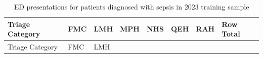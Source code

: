 \documentclass[
  a4paper,
  ,captions=tableheading
]{scrartcl}
\begin{document}
\begin{longtable}[]{@{}
  >{\raggedright\arraybackslash}p{}
  >{\raggedleft\arraybackslash}p{}
  >{\raggedleft\arraybackslash}p{}
  >{\raggedleft\arraybackslash}p{}
  >{\raggedleft\arraybackslash}p{}
  >{\raggedleft\arraybackslash}p{}
  >{\raggedleft\arraybackslash}p{}
  >{\raggedleft\arraybackslash}p{}@{}}
\caption{\label{tbl:hospitals_2023}ED presentations for patients
diagnosed with sepsis in 2023 training sample}\tabularnewline
\toprule\noalign{}
\begin{minipage}[b]{\linewidth}\raggedright
Triage Category
\end{minipage} & \begin{minipage}[b]{\linewidth}\raggedleft
FMC
\end{minipage} & \begin{minipage}[b]{\linewidth}\raggedleft
LMH
\end{minipage} & \begin{minipage}[b]{\linewidth}\raggedleft
MPH
\end{minipage} & \begin{minipage}[b]{\linewidth}\raggedleft
NHS
\end{minipage} & \begin{minipage}[b]{\linewidth}\raggedleft
QEH
\end{minipage} & \begin{minipage}[b]{\linewidth}\raggedleft
RAH
\end{minipage} & \begin{minipage}[b]{\linewidth}\raggedleft
Row Total
\end{minipage} \\
\midrule\noalign{}
\endfirsthead
\toprule\noalign{}
\begin{minipage}[b]{\linewidth}\raggedright
Triage Category
\end{minipage} & \begin{minipage}[b]{\linewidth}\raggedleft
FMC
\end{minipage} & \begin{minipage}[b]{\linewidth}\raggedleft
LMH
\end{minipage} & \begin{minipage}[b]{\linewidth}\raggedleft

\end{minipage}
\end{longtable}
\end{document}
